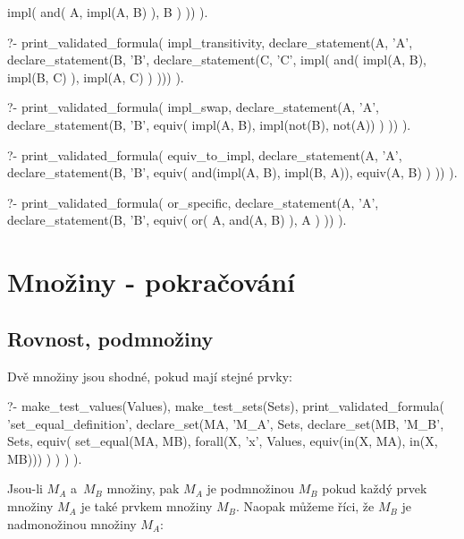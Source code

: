 \begin{fact}
\begin{prolog}
		impl(
			and(
				A,
				impl(A, B)
			),
			B
		)
	))
).
\end{prolog}
\begin{prolog}
?- print_validated_formula(
	impl_transitivity,
	declare_statement(A, 'A', declare_statement(B, 'B', declare_statement(C, 'C',
		impl(
			and(
				impl(A, B),
				impl(B, C)
			),
			impl(A, C)
		)
	)))
).
\end{prolog}
\begin{prolog}
?- print_validated_formula(
	impl_swap,
	declare_statement(A, 'A', declare_statement(B, 'B',
		equiv(
			impl(A, B),
			impl(not(B), not(A))
		)
	))
).
\end{prolog}
\begin{prolog}
?- print_validated_formula(
	equiv_to_impl,
	declare_statement(A, 'A', declare_statement(B, 'B',
		equiv(
			and(impl(A, B), impl(B, A)),
			equiv(A, B)
		)
	))
).
\end{prolog}
\begin{prolog}
?- print_validated_formula(
	or_specific,
	declare_statement(A, 'A', declare_statement(B, 'B',
		equiv(
			or(
				A,
				and(A, B)
			),
			A
		)
	))
).
\end{prolog}
\end{fact}

\section{Množiny - pokračování}

\subsection{Rovnost, podmnožiny}
Dvě množiny jsou shodné, pokud mají stejné prvky:

\begin{prolog}
?- 	make_test_values(Values),
	make_test_sets(Sets),
	print_validated_formula(
		'set_equal_definition',
		declare_set(MA, 'M_A', Sets,
			declare_set(MB, 'M_B', Sets,
				equiv(
					set_equal(MA, MB),
					forall(X, 'x', Values, equiv(in(X, MA), in(X, MB)))
				)
			)
		)
	).
\end{prolog}

Jsou-li \(M_A\) a~\(M_B\) množiny, pak \(M_A\) je podmnožinou \(M_B\) pokud každý prvek množiny \(M_A\) je také prvkem množiny \(M_B\). Naopak můžeme říci, že \(M_B\) je nadmonožinou množiny \(M_A\):

